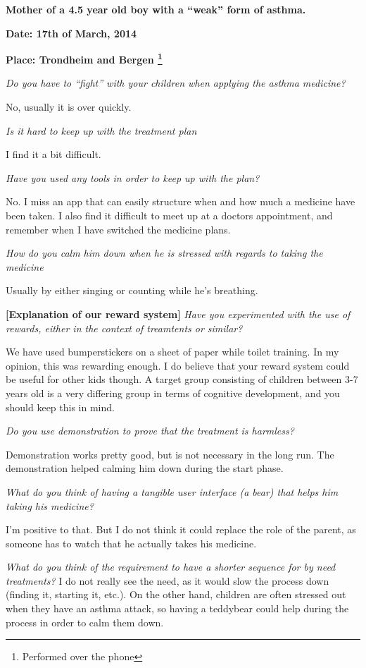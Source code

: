 
\textbf{Mother of a 4.5 year old boy with a ``weak'' form of asthma.}

\textbf{Date: 17th of March, 2014}

\textbf{Place: Trondheim and Bergen \footnote{Performed over the phone}} 

\emph{Do you have to ``fight'' with your children when applying the asthma medicine?}

No, usually it is over quickly.

\emph{Is it hard to keep up with the treatment plan}

I find it a bit difficult. 

\emph{Have you used any tools in order to keep up with the plan?}

No. I miss an app that can easily structure when and how much a medicine have been taken. 
I also find it difficult to meet up at a doctors appointment, and remember when I have switched the medicine plans. 

\emph{How do you calm him down when he is stressed with regards to taking the medicine}

Usually by either singing or counting while he's breathing. 

\textbf{[Explanation of our reward system]}
\emph{Have you experimented with the use of rewards, either in the context of treamtents or similar?}

We have used bumperstickers on a sheet of paper while toilet training. In my opinion, this was rewarding enough. I do believe that your reward system could be useful for other kids though. A target group consisting of children between 3-7 years old is a very differing group in terms of cognitive development, and you should keep this in mind.  

\emph{Do you use demonstration to prove that the treatment is harmless?}

Demonstration works pretty good, but is not necessary in the long run. The demonstration helped calming him down during the start phase. 

\emph{What do you think of having a tangible user interface (a bear) that helps him taking his medicine?}

I'm positive to that. But I do not think it could replace the role of the parent, as someone has to watch that he actually takes his medicine. 

\emph{What do you think of the requirement to have a shorter sequence for by need treatments? }
I do not really see the need, as it would slow the process down (finding it, starting it, etc.). On the other hand, children are often stressed out when they have an asthma attack, so having a teddybear could help during the process in order to calm them down. 

